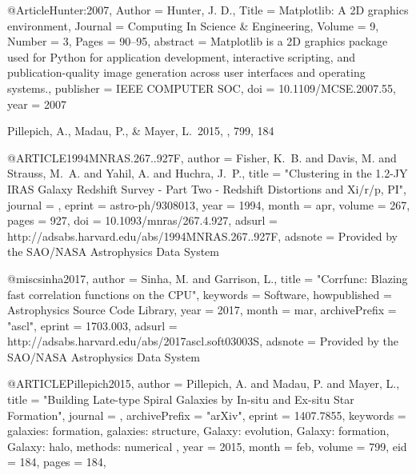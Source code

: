 @Article{Hunter:2007,
  Author    = {Hunter, J. D.},
  Title     = {Matplotlib: A 2D graphics environment},
  Journal   = {Computing In Science \& Engineering},
  Volume    = {9},
  Number    = {3},
  Pages     = {90--95},
  abstract  = {Matplotlib is a 2D graphics package used for Python
  for application development, interactive scripting, and
  publication-quality image generation across user
  interfaces and operating systems.},
  publisher = {IEEE COMPUTER SOC},
  doi = {10.1109/MCSE.2007.55},
  year      = 2007
}

 Pillepich, A., Madau, P., \& Mayer, L.\ 2015, \apj, 799, 184 

@ARTICLE{1994MNRAS.267..927F,
   author = {{Fisher}, K.~B. and {Davis}, M. and {Strauss}, M.~A. and {Yahil}, A. and 
	{Huchra}, J.~P.},
    title = "{Clustering in the 1.2-JY IRAS Galaxy Redshift Survey - Part Two - Redshift Distortions and Xi/r/p, PI}",
  journal = {\mnras},
   eprint = {astro-ph/9308013},
     year = 1994,
    month = apr,
   volume = 267,
    pages = {927},
      doi = {10.1093/mnras/267.4.927},
   adsurl = {http://adsabs.harvard.edu/abs/1994MNRAS.267..927F},
  adsnote = {Provided by the SAO/NASA Astrophysics Data System}
}

@misc{sinha2017,
   author = {{Sinha}, M. and {Garrison}, L.},
   title = "{Corrfunc: Blazing fast correlation functions on the CPU}",
   keywords = {Software},
   howpublished = {Astrophysics Source Code Library},
   year = 2017,
   month = mar,
   archivePrefix = "ascl",
   eprint = {1703.003},
   adsurl = {http://adsabs.harvard.edu/abs/2017ascl.soft03003S},
   adsnote = {Provided by the SAO/NASA Astrophysics Data System}
}


@ARTICLE{Pillepich2015,
   author = {{Pillepich}, A. and {Madau}, P. and {Mayer}, L.},
    title = "{Building Late-type Spiral Galaxies by In-situ and Ex-situ Star Formation}",
  journal = {\apj},
archivePrefix = "arXiv",
   eprint = {1407.7855},
 keywords = {galaxies: formation, galaxies: structure, Galaxy: evolution, Galaxy: formation, Galaxy: halo, methods: numerical },
     year = 2015,
    month = feb,
   volume = 799,
      eid = {184},
    pages = {184},
}

